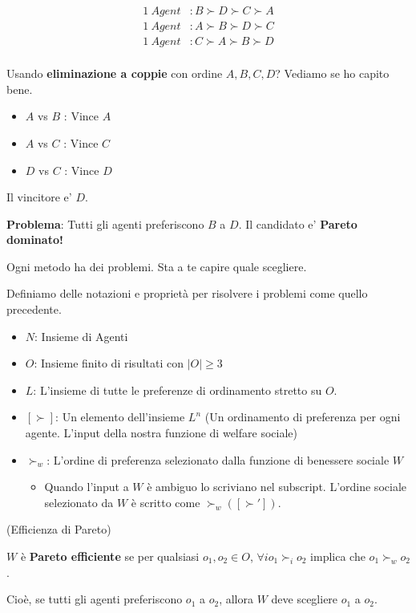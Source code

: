 \begin{equation}
    \begin{aligned}
        1 \ Agent & : B \succ D \succ C \succ A \\
        1 \ Agent & : A \succ B \succ D \succ C \\
        1 \ Agent & : C \succ A \succ B \succ D \\
    \end{aligned}
\end{equation}

Usando \textbf{eliminazione a coppie} con ordine $A,B,C,D$? 
Vediamo se ho capito bene.

\begin{itemize}
    \item $A$ vs $B$ : Vince $A$
    \item $A$ vs $C$ : Vince $C$
    \item $D$ vs $C$ : Vince $D$
\end{itemize}

Il vincitore e' $D$.

\textbf{Problema}: Tutti gli agenti preferiscono $B$ a $D$. Il candidato e' \textbf{Pareto dominato!}

Ogni metodo ha dei problemi. Sta a te capire quale scegliere.

Definiamo delle notazioni e proprietà per risolvere i problemi come quello precedente.

\begin{itemize}
    \item $N$: Insieme di Agenti
    \item $O$: Insieme finito di risultati con $|O| \geq 3$
    \item $L$: L'insieme di tutte le preferenze di ordinamento stretto su $O$.
    \item $[\succ]$: Un elemento dell'insieme $L^n$ (Un ordinamento di preferenza per ogni agente. L'input della nostra funzione di welfare sociale)
    \item $\succ_w$: L'ordine di preferenza selezionato dalla funzione di benessere sociale $W$
    \begin{itemize}
        \item Quando l'input a $W$ è ambiguo lo scriviano nel subscript. L'ordine sociale selezionato da $W$
        è scritto come $\succ_{w}([\succ'])$.
    \end{itemize}
\end{itemize}

\begin{definition}
    (Efficienza di Pareto)

    $W$ è \textbf{Pareto efficiente} se per qualsiasi $o_1, o_2 \in O$,
    $\forall i o_1 \succ_i o_2$ implica che $o_1 \succ_w o_2$.

    Cioè, se tutti gli agenti preferiscono $o_1$ a $o_2$, allora $W$ deve scegliere $o_1$ a $o_2$.
\end{definition}

